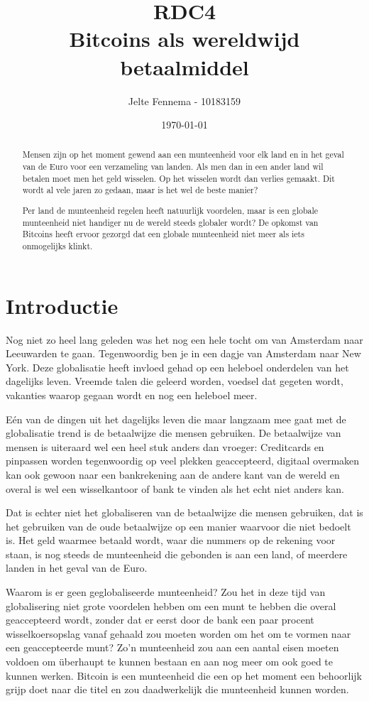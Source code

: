 \documentclass[a4paper]{article}
\title{RDC4\\Bitcoins als wereldwijd betaalmiddel}
\author{Jelte Fennema - 10183159}
\date{\today}
\begin{document}
\maketitle
\begin{abstract}
    Mensen zijn op het moment gewend aan een munteenheid voor elk land en in het
    geval van de Euro voor een verzameling van landen. Als men dan in een ander
    land wil betalen moet men het geld wisselen. Op het wisselen wordt dan
    verlies gemaakt. Dit wordt al vele jaren zo gedaan, maar is het wel de beste
    manier?

    Per land de munteenheid regelen heeft natuurlijk voordelen, maar is een
    globale munteenheid niet handiger nu de wereld steeds globaler wordt? De
    opkomst van Bitcoins heeft ervoor gezorgd dat een globale munteenheid niet
    meer als iets onmogelijks klinkt.

\end{abstract}

\newpage
\tableofcontents
\newpage

\section{Introductie}
Nog niet zo heel lang geleden was het nog een hele tocht om van Amsterdam naar
Leeuwarden te gaan. Tegenwoordig ben je in een dagje van Amsterdam naar New
York. Deze globalisatie heeft invloed gehad op een heleboel onderdelen van het
dagelijks leven. Vreemde talen die geleerd worden, voedsel dat gegeten wordt,
vakanties waarop gegaan wordt en nog een heleboel meer.

E\'en van de dingen uit het dagelijks leven die maar langzaam mee gaat met de
globalisatie trend is de betaalwijze die mensen gebruiken. De betaalwijze van
mensen is uiteraard wel een heel stuk anders dan vroeger: Creditcards en
pinpassen worden tegenwoordig op veel plekken geaccepteerd, digitaal overmaken
kan ook gewoon naar een bankrekening aan de andere kant van de wereld en overal
is wel een wisselkantoor of bank te vinden als het echt niet anders kan.

Dat is echter niet het globaliseren van de betaalwijze die mensen gebruiken, dat
is het gebruiken van de oude betaalwijze op een manier waarvoor die niet bedoelt
is.  Het geld waarmee betaald wordt, waar die nummers op de rekening voor staan,
is nog steeds de munteenheid die gebonden is aan een land, of meerdere landen in
het geval van de Euro.

Waarom is er geen geglobaliseerde munteenheid? Zou het in deze tijd van
globalisering niet grote voordelen hebben om een munt te hebben die overal
geaccepteerd wordt, zonder dat er eerst door de bank een paar procent
wisselkoersopslag vanaf gehaald zou moeten worden om het om te vormen naar een
geaccepteerde munt? Zo'n munteenheid zou aan een aantal eisen moeten voldoen om
\"uberhaupt te kunnen bestaan en aan nog meer om ook goed te kunnen werken.
Bitcoin is een munteenheid die een op het moment een behoorlijk grijp doet naar
die titel en zou daadwerkelijk die munteenheid kunnen worden.
\end{document}
